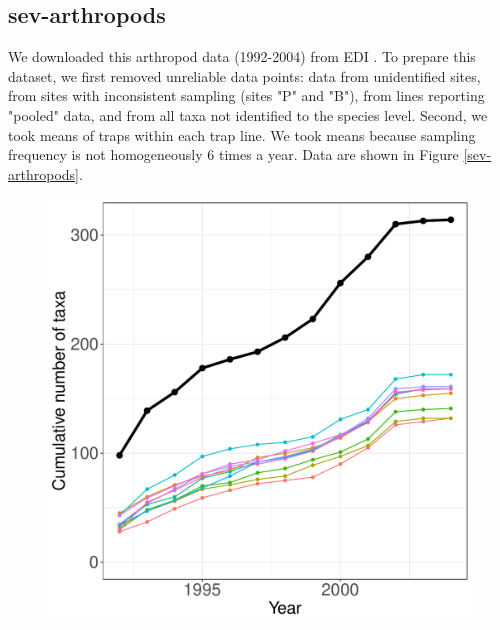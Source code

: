 \documentclass[11pt, oneside]{article}
\begin{document}
\subsection {sev-arthropods}
We downloaded this arthropod data (1992-2004) from EDI \citep{lightfoot_ground_2013}. 
To prepare this dataset, we first removed unreliable data points: data from unidentified sites, from sites with inconsistent sampling (sites "P" and "B"), from lines reporting "pooled" data, and from all taxa not identified to the species level. 
Second, we took means of traps within each trap line. 
We took means because sampling frequency is not homogeneously 6 times a year. 
Data are shown in Figure \ref{sev-arthropods}.
  
\begin{figure}[h!]
\centering
\includegraphics[scale = 0.4]{sev-arthropods-compagnoni_species_accumulation_curve.pdf}

\end{figure}
\end{document}

